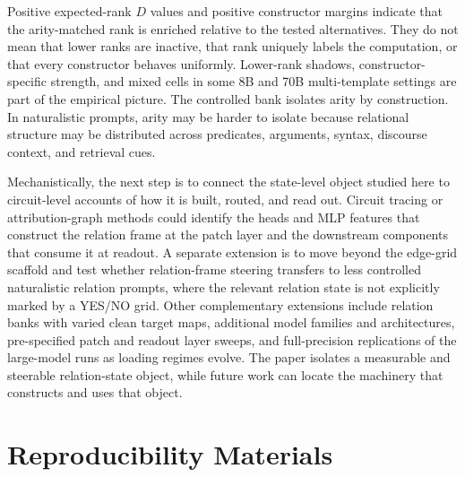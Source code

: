 \documentclass[11pt]{article}
\begin{document}
Positive expected-rank \(D\) values and positive constructor margins indicate that the arity-matched rank is enriched relative to the tested alternatives. They do not mean that lower ranks are inactive, that rank uniquely labels the computation, or that every constructor behaves uniformly. Lower-rank shadows, constructor-specific strength, and mixed cells in some 8B and 70B multi-template settings are part of the empirical picture. The controlled bank isolates arity by construction. In naturalistic prompts, arity may be harder to isolate because relational structure may be distributed across predicates, arguments, syntax, discourse context, and retrieval cues.

Mechanistically, the next step is to connect the state-level object studied here to circuit-level accounts of how it is built, routed, and read out. Circuit tracing or attribution-graph methods could identify the heads and MLP features that construct the relation frame at the patch layer and the downstream components that consume it at readout. A separate extension is to move beyond the edge-grid scaffold and test whether relation-frame steering transfers to less controlled naturalistic relation prompts, where the relevant relation state is not explicitly marked by a YES/NO grid. Other complementary extensions include relation banks with varied clean target maps, additional model families and architectures, pre-specified patch and readout layer sweeps, and full-precision replications of the large-model runs as loading regimes evolve. The paper isolates a measurable and steerable relation-state object, while future work can locate the machinery that constructs and uses that object.

\section{Reproducibility Materials}
\enlargethispage{2\baselineskip}
\end{document}
